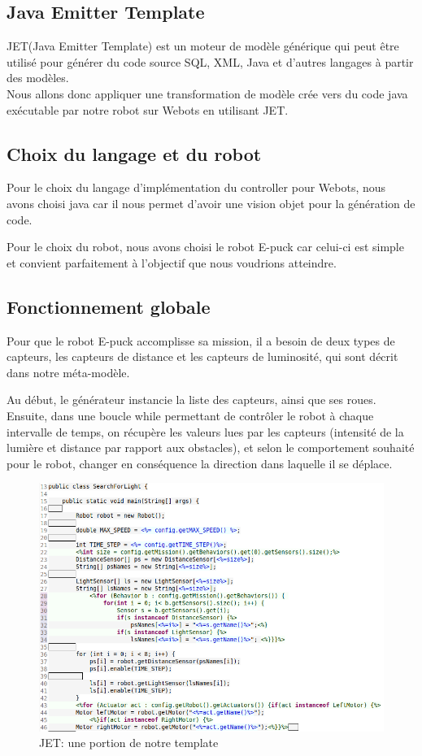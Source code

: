 \documentclass[a4paper,12pt]{article}
\begin{document}
\subsection{Java Emitter Template}
JET(Java Emitter Template) est un moteur de modèle générique qui peut être utilisé pour générer du code source SQL, XML, Java et d'autres langages à partir des modèles.
\\Nous allons donc appliquer une transformation de modèle crée vers du code java exécutable par notre robot sur Webots en utilisant
JET.
\subsection{Choix du langage et du robot}
Pour le choix du langage d’implémentation du controller pour Webots, nous avons choisi java car il nous permet d’avoir une vision objet pour la génération de code.

Pour le choix du robot, nous avons choisi le robot E-puck car celui-ci est simple et convient parfaitement à l'objectif que nous voudrions atteindre.
\subsection{Fonctionnement globale}
Pour que le robot E-puck accomplisse sa mission, il a besoin de deux types de capteurs, les capteurs de distance et les capteurs de luminosité, qui sont décrit dans notre méta-modèle.

Au début, le générateur instancie la liste des capteurs, ainsi que ses roues. Ensuite, dans une boucle while permettant de contrôler le robot à chaque intervalle de temps, on récupère les valeurs lues par les capteurs (intensité de la lumière et distance par rapport aux obstacles), et selon le comportement souhaité pour le robot, changer en conséquence la direction dans laquelle il se déplace.
\begin{figure}[!h]  
    \includegraphics[width=12cm]{template.png}
    \caption{JET: une portion de notre template}
\end{figure}
\end{document}
